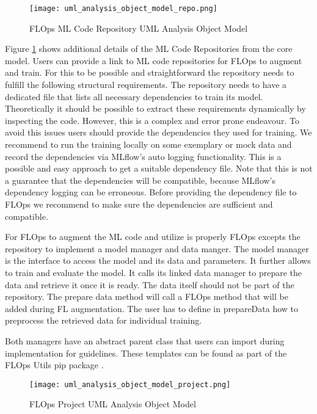 \begin{figure}[h]
    \centering
    \texttt{[image: uml\_analysis\_object\_model\_repo.png]}
    \caption{FLOps ML Code Repository UML Analysis Object Model}
    \label{fig:uml_repo_analysis_object_model}
\end{figure}

Figure \ref{fig:uml_repo_analysis_object_model} shows additional details of the ML Code Repositories from the core model.
Users can provide a link to ML code repositories for FLOps to augment and train.
For this to be possible and straightforward the repository needs to fulfill the following structural requirements.
The repository needs to have a dedicated file that lists all necessary dependencies to train its model.
Theoretically it should be possible to extract these requirements dynamically by inspecting the code.
However, this is a complex and error prone endeavour.
To avoid this issues users should provide the dependencies they used for training.
We recommend to run the training locally on some exemplary or mock data and record the dependencies via MLflow's auto logging functionality.
This is a possible and easy approach to get a suitable dependency file.
Note that this is not a guarantee that the dependencies will be compatible, because MLflow's dependency logging can be erroneous.
Before providing the dependency file to FLOps we recommend to make sure the dependencies are sufficient and compatible.

For FLOps to augment the ML code and utilize is properly FLOps excepts the repository to implement a model manager and data manger.
The model manager is the interface to access the model and its data and parameters.
It further allows to train and evaluate the model.
It calls its linked data manager to prepare the data and retrieve it once it is ready.
The data itself should not be part of the repository.
The prepare data method will call a FLOps method that will be added during FL augmentation.
The user has to define in prepareData how to preprocess the retrieved data for individual training.

Both managers have an abstract parent class that users can import during implementation for guidelines.
These templates can be found as part of the FLOps Utils pip package \cite{flops_utils_pip}.

\begin{figure}[h]
    \centering
    \texttt{[image: uml\_analysis\_object\_model\_project.png]}
    \caption{FLOps Project UML Analysis Object Model}
    \label{fig:uml_project_analysis_object_model}
\end{figure}

